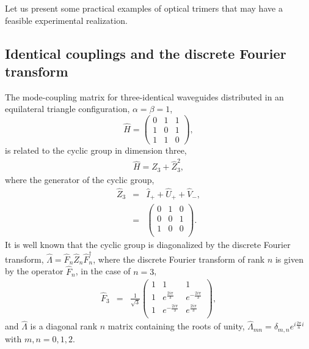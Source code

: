 \documentclass[9pt,twocolumn,twoside]{osajnl}
\begin{document}
Let us present some practical examples of optical trimers that may have a feasible experimental realization.


\subsection{Identical couplings and the discrete Fourier transform}

The mode-coupling matrix for three-identical waveguides distributed in an equilateral triangle configuration, $\alpha = \beta = 1$, 
\begin{equation}
\hat{H}=\left( \begin{array}{ccc}
0 & 1 & 1 \\
1 & 0 & 1 \\
1 & 1 & 0 \end{array} \right),	 
\end{equation}
is related to the cyclic group in dimension three, 
\begin{eqnarray}
\hat{H} =  \hat{Z}_{3} + \hat{Z}_{3}^{2} ,
\end{eqnarray}
where the generator of the cyclic group, 
\begin{eqnarray}
\hat{Z}_{3} &=& \hat{I}_{+} + \hat{U}_{+} + \hat{V}_{-}, \nonumber \\
&=&\left(
\begin{array}{ccc}
 0 & 1 & 0 \\
 0 & 0 & 1 \\
 1 & 0 & 0 \\
\end{array}\right).
\end{eqnarray}
It is well known that the cyclic group is diagonalized by the discrete Fourier transform, $\hat{\Lambda} = \hat{F}_{n} \hat{Z}_{n} \hat{F}_{n}^{\dagger}$, where the discrete Fourier transform of rank $n$ is given by the operator $\hat{F}_{n}$,  in the case of $n=3$,
\begin{eqnarray}
\hat{F}_{3} &=& 
\frac{1}{\sqrt{3}}
\left(
\begin{array}{ccc}
 1 & 1 & 1 \\
 1 & e^{\frac{2 i \pi}{3}} & e^{-\frac{2 i \pi}{3}} \\
 1 & e^{-\frac{2 i \pi}{3}} & e^{\frac{2 i \pi}{3}} \\
\end{array}\right),
\end{eqnarray}
and $\hat{\Lambda}$ is a diagonal rank $n$ matrix containing the roots of unity, $\hat{\Lambda}_{mn} = \delta_{m,n} e^{ i \frac{2 \pi}{n} i}$ with $m,n = 0,1,2$.
\end{document}

